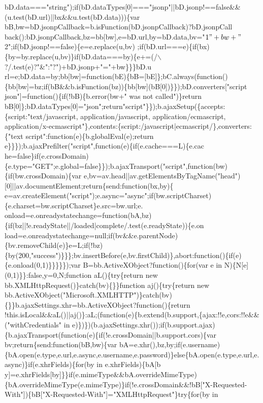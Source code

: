 \begin{DoxyCode}
{       bD.data==="string");if(bD.dataTypes[0]==="jsonp"||bD.jsonp!==false&&(u.test(bD.url)||bx&&u.test(bD.data)))\{var
       bB,bw=bD.jsonpCallback=b.isFunction(bD.jsonpCallback)?bD.jsonpCall
      back():bD.jsonpCallback,bz=bb[bw],e=bD.url,by=bD.data,bv="$1"+bw+"$2";if(bD.jsonp!==false)\{e=e.replace(u,bv)
      ;if(bD.url===e)\{if(bx)\{by=by.replace(u,bv)\}if(bD.data===by)\{e+=(/\(\backslash\)?/.test(e)?"&":"?")+bD.jsonp+"="+bw\}\}\}bD.u
      rl=e;bD.data=by;bb[bw]=function(bE)\{bB=[bE]\};bC.always(function()\{bb[bw]=bz;if(bB&&b.isFunction(bz))\{bb[bw](bB[0])\}\});bD.converters["script json"]=function()\{if(!bB)\{b.error(bw+" was not called")\}return
       bB[0]\};bD.dataTypes[0]="json";return"script"\}\});b.ajaxSetup(\{accepts:\{script:"text/javascript, application/javascript,
       application/ecmascript,
       application/x-ecmascript"\},contents:\{script:/javascript|ecmascript/\},converters:\{"text script":function(e)\{b.globalEval(e);return
       e\}\}\});b.ajaxPrefilter("script",function(e)\{if(e.cache===L)\{e.cac
      he=false\}if(e.crossDomain)\{e.type="GET";e.global=false\}\});b.ajaxTransport("script",function(bw)\{if(bw.crossDomain)\{var
       e,bv=av.head||av.getElementsByTagName("head")[0]||av.documentElement;return\{send:function(bx,by)\{
      e=av.createElement("script");e.async="async";if(bw.scriptCharset)\{e.charset=bw.scriptCharset\}e.src=bw.url;e.
      onload=e.onreadystatechange=function(bA,bz)\{if(bz||!e.readyState||/loaded|complete/.test(e.readyState))\{e.on
      load=e.onreadystatechange=null;if(bv&&e.parentNode)\{bv.removeChild(e)\}e=L;if(!bz)\{by(200,"success")\}\}\};bv.insertBefore(e,bv.firstChild)\},abort:function()\{if(e)\{e.onload(0,1)\}\}\}\}\});var
       B=bb.ActiveXObject?function()\{for(var e in N)\{N[e](0,1)\}\}:false,y=0,N;function aL()\{try\{return new bb.XMLHttpRequest()\}catch(bv)\{\}\}function
       aj()\{try\{return new
       bb.ActiveXObject("Microsoft.XMLHTTP")\}catch(bv)\{\}\}b.ajaxSettings.xhr=bb.ActiveXObject?function()\{return
       !this.isLocal&&aL()||aj()\}:aL;(function(e)\{b.extend(b.support,\{ajax:!!e,cors:!!e&&("withCredentials" in
       e)\})\})(b.ajaxSettings.xhr());if(b.support.ajax)\{b.ajaxTransport(function(e)\{if(!e.crossDomain||b.support.cors)\{var bv;return\{send:function(bB,bw)\{var
       bA=e.xhr(),bz,by;if(e.username)\{bA.open(e.type,e.url,e.async,e.username,e.password)\}else\{bA.open(e.type,e.url,e.async)\}if(e.xhrFields)\{for(by in
       e.xhrFields)\{bA[b
      y]=e.xhrFields[by]\}\}if(e.mimeType&&bA.overrideMimeType)\{bA.overrideMimeType(e.mimeType)\}if(!e.crossDomain&&!bB["X-Requested-With"])\{bB["X-Requested-With"]="XMLHttpRequest"\}try\{for(by in
}
\end{DoxyCode}
